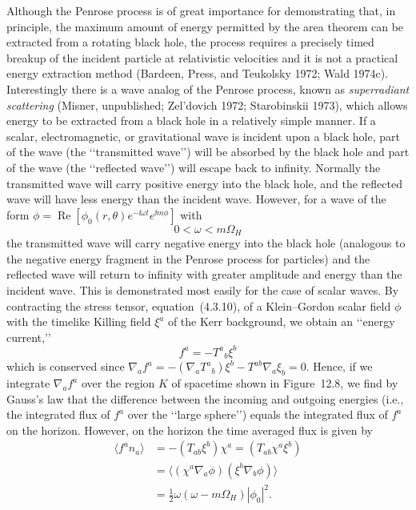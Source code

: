 Although the Penrose process is of great importance for demonstrating that, in
principle, the maximum amount of energy permitted by the area theorem can be
extracted from a rotating black hole, the process requires a precisely timed breakup
of the incident particle at relativistic velocities and it is not a practical energy
extraction method (Bardeen, Press, and Teukolsky 1972; Wald 1974c). Interestingly
there is a wave analog of the Penrose process, known as \emph{superradiant
scattering} (Misner, unpublished; Zel'dovich 1972; Starobinskii 1973), which allows
energy to be extracted from a black hole in a relatively simple manner. If a scalar,
electromagnetic, or gravitational wave is incident upon a black hole, part of the wave
(the \lq\lq transmitted wave\rq\rq ) will be absorbed by the black hole and part of the
wave (the \lq\lq reflected wave\rq\rq ) will escape back to infinity. Normally the
transmitted wave will carry positive energy into the black hole, and the reflected wave
will have less energy than the incident wave. However, for a wave of the form
\(\phi=\operatorname{Re}[\phi_0(r,\theta)e^{-\ii\omega t}e^{\ii m\phi}]\) with
\begin{equation}
 0<\omega<m\Omega_H
 \tag{12.4.18}\label{eq:12.4.18}
\end{equation}
the transmitted wave will carry negative energy into the black hole (analogous to the
negative energy fragment in the Penrose process for particles) and the reflected wave
will return to infinity with greater amplitude and energy than the incident wave. This
is demonstrated most easily for the case of scalar waves. By contracting the stress
tensor, equation~(4.3.10), of a Klein--Gordon scalar field \(\phi\) with the timelike
Killing field \(\xi^a\) of the Kerr background, we obtain an \lq\lq energy current,\rq\rq
\begin{equation}
 f^a=-T^a{}_{b}\xi^b
 \tag{12.4.19}\label{eq:12.4.19}
\end{equation}
which is conserved since \(\nabla_af^a=-(\nabla_aT^a{}_{b})\xi^b-
T^{ab}\nabla_a\xi_b=0\). Hence, if we integrate \(\nabla_af^a\) over the region
\(K\) of spacetime shown in Figure~12.8, we find by Gauss's law that the difference
between the incoming and outgoing energies (i.e., the integrated flux of \(f^a\) over
the \lq\lq large sphere\rq\rq ) equals the integrated flux of \(f^a\) on the horizon.
However, on the horizon the time averaged flux is given by
\begin{equation}
\begin{aligned}
 \langle f^an_a\rangle&=-(T_{ab}\xi^b)\chi^a=(T_{ab}\chi^a\xi^b)\\
 &=\langle(\chi^a\nabla_a\phi)(\xi^b\nabla_b\phi)\rangle\\
 &=\frac12\omega(\omega-m\Omega_H)|\phi_0|^2 .
\end{aligned}
\tag{12.4.20}\label{eq:12.4.20}
\end{equation}

